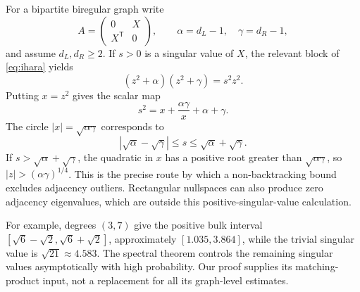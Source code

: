 For a bipartite biregular graph write
\[
A=\begin{pmatrix}0&X\\X^{\mathsf T}&0\end{pmatrix},\qquad
\alpha=d_L-1,\quad\gamma=d_R-1,
\]
and assume $d_L,d_R\ge2$. If $s>0$ is a singular value of $X$, the relevant block of \eqref{eq:ihara} yields
\begin{equation}\label{eq:biregularbridge}
(z^2+\alpha)(z^2+\gamma)=s^2z^2.
\end{equation}
Putting $x=z^2$ gives the scalar map
\begin{equation}\label{eq:scalarbridge}
s^2=x+\frac{\alpha\gamma}{x}+\alpha+\gamma.
\end{equation}
The circle $|x|=\sqrt{\alpha\gamma}$ corresponds to
\[
|\sqrt\alpha-\sqrt\gamma|\le s\le\sqrt\alpha+\sqrt\gamma.
\]
If $s>\sqrt\alpha+\sqrt\gamma$, the quadratic in $x$ has a positive root greater than $\sqrt{\alpha\gamma}$, so $|z|>(\alpha\gamma)^{1/4}$. This is the precise route by which a non-backtracking bound excludes adjacency outliers. Rectangular nullspaces can also produce zero adjacency eigenvalues, which are outside this positive-singular-value calculation.

For example, degrees $(3,7)$ give the positive bulk interval $[\sqrt6-\sqrt2,\sqrt6+\sqrt2]$, approximately $[1.035,3.864]$, while the trivial singular value is $\sqrt{21}\approx4.583$. The spectral theorem controls the remaining singular values asymptotically with high probability. Our proof supplies its matching-product input, not a replacement for all its graph-level estimates.
